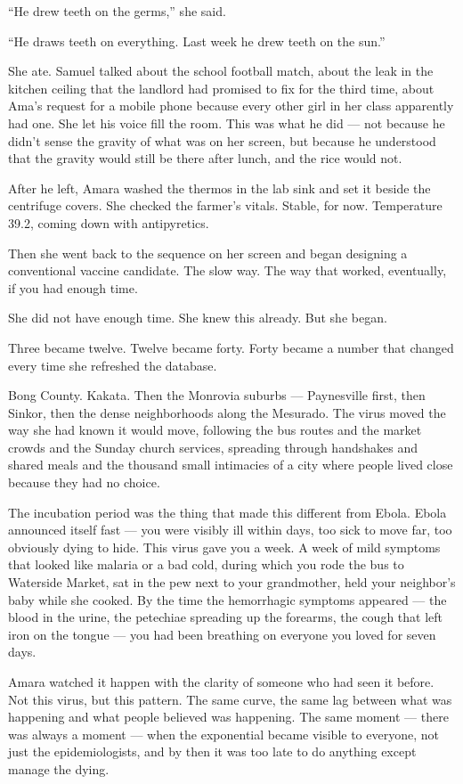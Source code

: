 ``He drew teeth on the germs,'' she said.

``He draws teeth on everything. Last week he drew teeth on the sun.''

She ate. Samuel talked about the school football match, about the leak in the kitchen ceiling that the landlord had promised to fix for the third time, about Ama's request for a mobile phone because every other girl in her class apparently had one. She let his voice fill the room. This was what he did --- not because he didn't sense the gravity of what was on her screen, but because he understood that the gravity would still be there after lunch, and the rice would not.

After he left, Amara washed the thermos in the lab sink and set it beside the centrifuge covers. She checked the farmer's vitals. Stable, for now. Temperature 39.2, coming down with antipyretics.

Then she went back to the sequence on her screen and began designing a conventional vaccine candidate. The slow way. The way that worked, eventually, if you had enough time.

She did not have enough time. She knew this already. But she began.


Three became twelve. Twelve became forty. Forty became a number that changed every time she refreshed the database.

Bong County. Kakata. Then the Monrovia suburbs --- Paynesville first, then Sinkor, then the dense neighborhoods along the Mesurado. The virus moved the way she had known it would move, following the bus routes and the market crowds and the Sunday church services, spreading through handshakes and shared meals and the thousand small intimacies of a city where people lived close because they had no choice.

The incubation period was the thing that made this different from Ebola. Ebola announced itself fast --- you were visibly ill within days, too sick to move far, too obviously dying to hide. This virus gave you a week. A week of mild symptoms that looked like malaria or a bad cold, during which you rode the bus to Waterside Market, sat in the pew next to your grandmother, held your neighbor's baby while she cooked. By the time the hemorrhagic symptoms appeared --- the blood in the urine, the petechiae spreading up the forearms, the cough that left iron on the tongue --- you had been breathing on everyone you loved for seven days.

Amara watched it happen with the clarity of someone who had seen it before. Not this virus, but this pattern. The same curve, the same lag between what was happening and what people believed was happening. The same moment --- there was always a moment --- when the exponential became visible to everyone, not just the epidemiologists, and by then it was too late to do anything except manage the dying.

